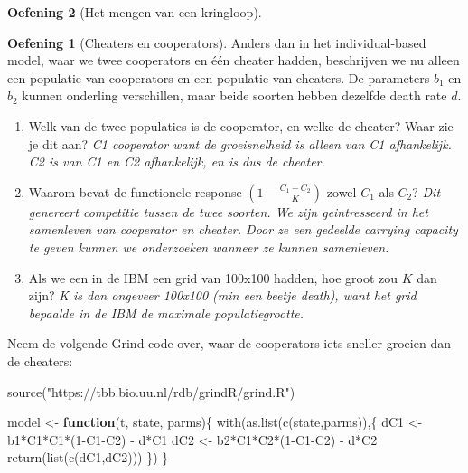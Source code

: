 \documentclass[
  a4paper,
]{scrbook}
\newenvironment{Shaded}{\begin{snugshade}}{\end{snugshade}}
\newcommand{\ControlFlowTok}[1]{\textcolor[rgb]{0.00,0.23,0.31}{\textbf{#1}}}
\newcommand{\DecValTok}[1]{\textcolor[rgb]{0.68,0.00,0.00}{#1}}
\newcommand{\FunctionTok}[1]{\textcolor[rgb]{0.28,0.35,0.67}{#1}}
\newcommand{\NormalTok}[1]{\textcolor[rgb]{0.00,0.23,0.31}{#1}}
\newcommand{\OtherTok}[1]{\textcolor[rgb]{0.00,0.23,0.31}{#1}}
\newcommand{\SpecialCharTok}[1]{\textcolor[rgb]{0.37,0.37,0.37}{#1}}
\newcommand{\StringTok}[1]{\textcolor[rgb]{0.13,0.47,0.30}{#1}}
\providecommand{\tightlist}{%
  \setlength{\itemsep}{0pt}\setlength{\parskip}{0pt}}\usepackage{longtable,booktabs,array}
\theoremstyle{definition}
\newtheorem{exercise}{Oefening}[chapter]
\theoremstyle{remark}
\begin{document}
\begin{exercise}[Het mengen van een
kringloop]
\begin{exercise}[Cheaters en
cooperators]
Anders dan in het individual-based model, waar we twee cooperators en
één cheater hadden, beschrijven we nu alleen een populatie van
cooperators en een populatie van cheaters. De parameters \(b_1\) en
\(b_2\) kunnen onderling verschillen, maar beide soorten hebben dezelfde
death rate \(d\).

\begin{enumerate}
\def\labelenumi{\alph{enumi}.}
\tightlist
\item
  Welk van de twee populaties is de cooperator, en welke de cheater?
  Waar zie je dit aan? \emph{C1 cooperator want de groeisnelheid is
  alleen van C1 afhankelijk. C2 is van C1 en C2 afhankelijk, en is dus
  de cheater.}
\item
  Waarom bevat de functionele response \((1-\frac{C_1+C_2}{K})\) zowel
  \(C_1\) als \(C_2\)? \emph{Dit genereert competitie tussen de twee
  soorten. We zijn geintresseerd in het samenleven van cooperator en
  cheater. Door ze een gedeelde carrying capacity te geven kunnen we
  onderzoeken wanneer ze kunnen samenleven.}
\item
  Als we een in de IBM een grid van 100x100 hadden, hoe groot zou \(K\)
  dan zijn? \emph{K is dan ongeveer 100x100 (min een beetje death), want
  het grid bepaalde in de IBM de maximale populatiegrootte.}
\end{enumerate}

Neem de volgende Grind code over, waar de cooperators iets sneller
groeien dan de cheaters:

\begin{Shaded}
\begin{Highlighting}[]
\FunctionTok{source}\NormalTok{(}\StringTok{"https://tbb.bio.uu.nl/rdb/grindR/grind.R"}\NormalTok{)}

\NormalTok{model }\OtherTok{\textless{}{-}} \ControlFlowTok{function}\NormalTok{(t, state, parms)\{}
  \FunctionTok{with}\NormalTok{(}\FunctionTok{as.list}\NormalTok{(}\FunctionTok{c}\NormalTok{(state,parms)),\{}
\NormalTok{    dC1 }\OtherTok{\textless{}{-}}\NormalTok{ b1}\SpecialCharTok{*}\NormalTok{C1}\SpecialCharTok{*}\NormalTok{C1}\SpecialCharTok{*}\NormalTok{(}\DecValTok{1}\SpecialCharTok{{-}}\NormalTok{C1}\SpecialCharTok{{-}}\NormalTok{C2) }\SpecialCharTok{{-}}\NormalTok{ d}\SpecialCharTok{*}\NormalTok{C1}
\NormalTok{    dC2 }\OtherTok{\textless{}{-}}\NormalTok{ b2}\SpecialCharTok{*}\NormalTok{C1}\SpecialCharTok{*}\NormalTok{C2}\SpecialCharTok{*}\NormalTok{(}\DecValTok{1}\SpecialCharTok{{-}}\NormalTok{C1}\SpecialCharTok{{-}}\NormalTok{C2) }\SpecialCharTok{{-}}\NormalTok{ d}\SpecialCharTok{*}\NormalTok{C2}
    \FunctionTok{return}\NormalTok{(}\FunctionTok{list}\NormalTok{(}\FunctionTok{c}\NormalTok{(dC1,dC2)))}
\NormalTok{  \})}
\NormalTok{\}  }


\end{Highlighting}
\end{Shaded}
\end{exercise}
\end{exercise}
\end{document}
